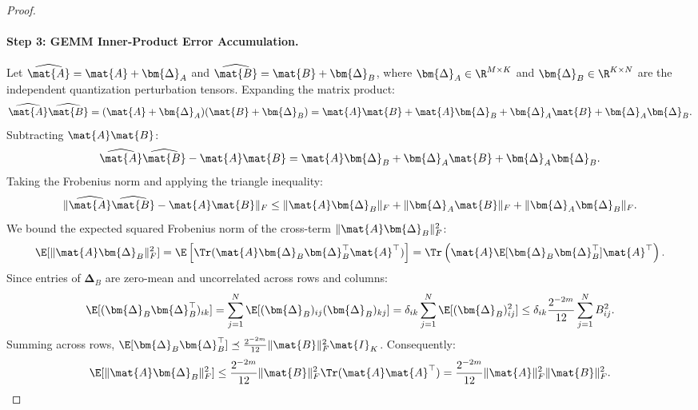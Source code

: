 \begin{proof}
\paragraph{Step 3: GEMM Inner-Product Error Accumulation.}
Let $\widehat{\mat{A}} = \mat{A} + \bm{\Delta}_A$ and $\widehat{\mat{B}} = \mat{B} + \bm{\Delta}_B$, where $\bm{\Delta}_A \in \R^{M \times K}$ and $\bm{\Delta}_B \in \R^{K \times N}$ are the independent quantization perturbation tensors.
Expanding the matrix product:
\begin{equation}
\widehat{\mat{A}} \widehat{\mat{B}} = (\mat{A} + \bm{\Delta}_A)(\mat{B} + \bm{\Delta}_B) = \mat{A}\mat{B} + \mat{A}\bm{\Delta}_B + \bm{\Delta}_A\mat{B} + \bm{\Delta}_A\bm{\Delta}_B.
\end{equation}
Subtracting $\mat{A}\mat{B}$:
\begin{equation}
\widehat{\mat{A}} \widehat{\mat{B}} - \mat{A}\mat{B} = \mat{A}\bm{\Delta}_B + \bm{\Delta}_A\mat{B} + \bm{\Delta}_A\bm{\Delta}_B.
\end{equation}
Taking the Frobenius norm and applying the triangle inequality:
\begin{equation}
\|\widehat{\mat{A}} \widehat{\mat{B}} - \mat{A}\mat{B}\|_F \le \|\mat{A}\bm{\Delta}_B\|_F + \|\bm{\Delta}_A\mat{B}\|_F + \|\bm{\Delta}_A\bm{\Delta}_B\|_F.
\label{app:eq:gemm_triangle_bound}
\end{equation}
We bound the expected squared Frobenius norm of the cross-term $\|\mat{A}\bm{\Delta}_B\|_F^2$:
\begin{equation}
\E[\|\mat{A}\bm{\Delta}_B\|_F^2] = \E\left[ \Tr(\mat{A}\bm{\Delta}_B \bm{\Delta}_B^\top \mat{A}^\top) \right] = \Tr\left( \mat{A} \E[\bm{\Delta}_B \bm{\Delta}_B^\top] \mat{A}^\top \right).
\end{equation}
Since entries of $\bm{\Delta}_B$ are zero-mean and uncorrelated across rows and columns:
\begin{equation}
\E[(\bm{\Delta}_B \bm{\Delta}_B^\top)_{ik}] = \sum_{j=1}^N \E[(\bm{\Delta}_B)_{ij} (\bm{\Delta}_B)_{kj}] = \delta_{ik} \sum_{j=1}^N \E[(\bm{\Delta}_B)_{ij}^2] \le \delta_{ik} \frac{2^{-2m}}{12} \sum_{j=1}^N B_{ij}^2.
\end{equation}
Summing across rows, $\E[\bm{\Delta}_B \bm{\Delta}_B^\top] \preceq \frac{2^{-2m}}{12} \|\mat{B}\|_F^2 \mat{I}_K$.
Consequently:
\begin{equation}
\E[\|\mat{A}\bm{\Delta}_B\|_F^2] \le \frac{2^{-2m}}{12} \|\mat{B}\|_F^2 \Tr(\mat{A}\mat{A}^\top) = \frac{2^{-2m}}{12} \|\mat{A}\|_F^2 \|\mat{B}\|_F^2.
\end{equation}

\end{proof}
